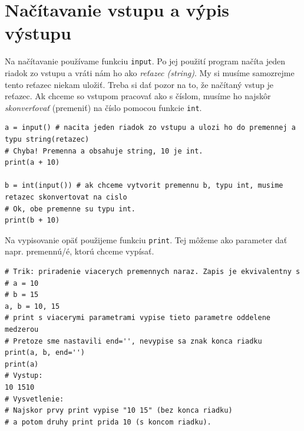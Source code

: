 \documentclass{article}
\begin{document}

\section{Načítavanie vstupu a výpis výstupu}



Na načítavanie používame funkciu \texttt{input}. Po jej použití program načíta jeden riadok zo vstupu
a vráti nám ho ako \textit{reťazec (string)}. My si musíme samozrejme tento reťazec niekam uložiť. Treba si dať pozor na to, že načítaný vstup je reťazec. Ak chceme so vstupom pracovať ako s číslom, musíme ho najskôr \textit{skonverťovať} (premeniť) na číslo pomocou funkcie \texttt{int}.


\begin{lstlisting}
a = input() # nacita jeden riadok zo vstupu a ulozi ho do premennej a typu string(retazec)
# Chyba! Premenna a obsahuje string, 10 je int.
print(a + 10)

b = int(input()) # ak chceme vytvorit premennu b, typu int, musime retazec skonvertovat na cislo
# Ok, obe premenne su typu int.
print(b + 10)
\end{lstlisting}

Na vypisovanie opäť použijeme funkciu \texttt{print}.
Tej môžeme ako parameter dať napr. premennú/é, ktorú chceme vypísať.

\begin{lstlisting}
# Trik: priradenie viacerych premennych naraz. Zapis je ekvivalentny s
# a = 10
# b = 15
a, b = 10, 15
# print s viacerymi parametrami vypise tieto parametre oddelene medzerou
# Pretoze sme nastavili end='', nevypise sa znak konca riadku
print(a, b, end='')
print(a)
# Vystup:
10 1510
# Vysvetlenie:
# Najskor prvy print vypise "10 15" (bez konca riadku)
# a potom druhy print prida 10 (s koncom riadku).
\end{lstlisting}
\end{document}

